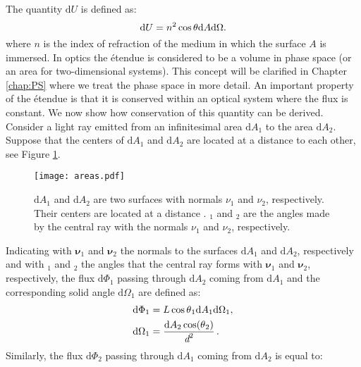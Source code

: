 The quantity $ \textrm{d}U $ is defined as:
\begin{equation}\label{etendue}
\textrm{d}U = n^2 \cos\mbox{$\theta$}\textrm{d}A\textrm{d}\Omega.
\end{equation}
where $n$ is the index of refraction of the medium in which the surface $A$ is immersed. In optics the \'{e}tendue is considered to be a volume in phase space  (or an area for two-dimensional systems). This concept will be clarified in Chapter \ref{chap:PS} where we treat the phase space in more detail.
An important property of the \'{e}tendue is that it is conserved within an optical system where the flux is constant. We now show how conservation of this quantity can be derived.
Consider a light ray emitted from an infinitesimal area $\textrm{d}A_1$ to the area $\textrm{d}A_2$. Suppose that the centers of $\textrm{d}A_1$ and $\textrm{d}A_2$ 
are located at a distance  to each other,  see Figure \ref{fig:etendue_conservation}.
\begin{figure}[h]
 \label{fig:etendue_conservation}
     \begin{center}
     \texttt{[image: areas.pdf]}
     \end{center}
     \caption{\footnotesize{$\textrm{d}A_1$ and $\textrm{d}A_2$ are two surfaces with normals $\nu_1$ and $\nu_2$, respectively. Their centers are located at a distance .
\myangle$_1$ and \myangle$_2$ are the angles made by the central ray with the normals $\nu_1$ and $\nu_2$, respectively.}}
\label{fig:etendue_conservation}
 \end{figure}
Indicating with $\boldsymbol{\nu}_1$ and $\boldsymbol{\nu}_2$ the normals to the surfaces $\textrm{d}A_1$ and $\textrm{d}A_2$, respectively and with \myangle$_1$ and \myangle$_2$ the angles that the central ray forms with $\boldsymbol{\nu}_1$ and $\boldsymbol{\nu}_2$, respectively,
the flux $\textrm{d}\Phi_1$ passing through $\textrm{d}A_2$ coming from $\textrm{d}A_1$ and the corresponding solid angle $\textrm{d}\Omega_1 $ are defined as:
\begin{equation}
\begin{split}
\textrm{d}\Phi_1 &= L \cos\mbox{$\theta$}_1 \textrm{d}A_1 \textrm{d}\Omega_1, \\
\textrm{d}\Omega_1 &= \frac{\textrm{d}A_2\cos(\mbox{$\theta$}_2)}{\textit{d}^2}\,.
\end{split}
\end{equation}
Similarly, the flux $\textrm{d}\Phi_2$ passing through $\textrm{d}A_1$ coming from $\textrm{d}A_2$ is equal to:

